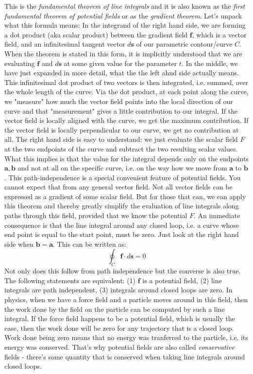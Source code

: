This is the \emph{fundamental theorem of line integrals} and it is also known as the \emph{first fundamental theorem of potential fields} or as the \emph{gradient theorem}. Let's unpack what this formula means: In the integrand of the right hand side, we are forming a dot product (aka scalar product) between the gradient field $\mathbf{f}$, which is a vector field, and an infinitesimal tangent vector $d\mathbf{s}$ of our parametric contour/curve $C$. When the theorem is stated in this form, it is implicitly understood that we are evaluating $\mathbf{f}$ and $d\mathbf{s}$ at some given value for the parameter $t$. In the middle, we have just expanded in more detail, what the the left ahnd side actually means. This infinitesimal dot product of two vectors is then integrated, i.e. summed, over the whole length of the curve. Via the dot product, at each point along the curve, we "measure" how much the vector field points into the local direction of our curve and that "measurement" gives a little contribution to our integral. If the vector field is locally aligned with the curve, we get the maximum contribution. If the vector field is locally perpendicular to our curve, we get no contribution at all. The right hand side is easy to understand: we just evaluate the scalar field $F$ at the two endpoints of the curve and subtract the two resulting scalar values. What this implies is that the value for the integral depends only on the endpoints $\mathbf{a,b}$ and not at all on the specific curve, i.e. on the way how we move from $\mathbf{a}$ to $\mathbf{b}$. This path-independence is a special convenient feature of potential fields. You cannot expect that from any general vector field. Not all vector fields can be expressed as a gradient of some scalar field. But for those that can, we can apply this theorem and thereby greatly simplify the evaluation of line integrals along paths through this field, provided that we know the potential $F$. An immediate consequence is that the line integral around any closed loop, i.e. a curve whose end point is equal to the start point, must be zero. Just look at the right hand side when $\mathbf{b = a}$. This can be written as:
\begin{equation}
\oint_C \mathbf{f} \cdot d\mathbf{s} = 0
\end{equation}
Not only does this follow from path independence but the converse is also true. The following statements are equivalent: (1) $\mathbf{f}$ is a potential field, (2) line integrals are path independent, (3) integrals around closed loops are zero. In physics, when we have a force field and a particle moves around in this field, then the work done by the field on the particle can be computed by such a line integral. If the force field happens to be a potential field, which is usually the case, then the work done will be zero for any trajectory that is a closed loop. Work done being zero means that no energy was tranferred to the particle, i.e. its energy was conserved. That's why potential fields are also called \emph{conservative} fields - there's some quantity that is conserved when taking line integrals around closed loops. 

